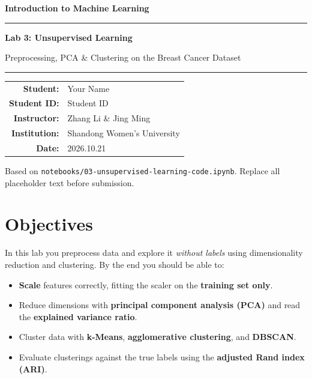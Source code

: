 \documentclass[11pt,a4paper]{article}
\newcommand{\Course}{Introduction to Machine Learning}
\newcommand{\LabNo}{Lab 3}
\newcommand{\LabTitle}{Unsupervised Learning}
\newcommand{\StudentName}{Your Name}          %
\newcommand{\StudentID}{Student ID}           %
\newcommand{\DueDate}{2026.10.21}                 %
\newcommand{\Instructor}{Zhang Li \& Jing Ming}
\newcommand{\Institution}{Shandong Women's University}
\begin{document}
\begin{titlepage}
\centering
\vspace*{2cm}
{\LARGE\bfseries \Course\par}
\vspace{0.6cm}
{\color{accent}\rule{\linewidth}{1.5pt}}\par
\vspace{0.5cm}
{\Huge\bfseries \LabNo: \LabTitle\par}
\vspace{0.3cm}
{\large Preprocessing, PCA \& Clustering on the Breast Cancer Dataset\par}
\vspace{0.4cm}
{\color{accent}\rule{\linewidth}{1.5pt}}\par
\vspace{2.3cm}

\begin{tabular}{rl}
  \textbf{Student:}    & \StudentName \\[4pt]
  \textbf{Student ID:} & \StudentID \\[4pt]
  \textbf{Instructor:} & \Instructor \\[4pt]
  \textbf{Institution:}& \Institution \\[4pt]
  \textbf{Date:}       & \DueDate \\
\end{tabular}

\vfill
{\color{cmt}\small Based on \texttt{notebooks/03-unsupervised-learning-code.ipynb}.
Replace all placeholder text before submission.}
\end{titlepage}

\tableofcontents
\newpage

\section{Objectives}
In this lab you preprocess data and explore it \emph{without labels} using
dimensionality reduction and clustering. By the end you should be able to:
\begin{itemize}[leftmargin=*]
  \item \textbf{Scale} features correctly, fitting the scaler on the
        \textbf{training set only}.
  \item Reduce dimensions with \textbf{principal component analysis (PCA)} and
        read the \textbf{explained variance ratio}.
  \item Cluster data with \textbf{k-Means}, \textbf{agglomerative clustering},
        and \textbf{DBSCAN}.
  \item Evaluate clusterings against the true labels using the
        \textbf{adjusted Rand index (ARI)}.
\end{itemize}
\end{document}
